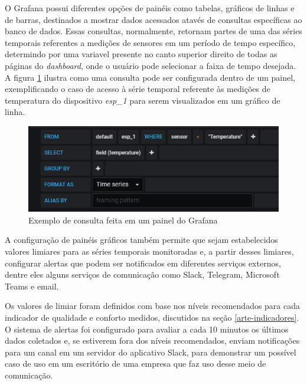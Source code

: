\documentclass[../monografia.tex]{subfiles}
\begin{document}
O Grafana possui diferentes opções de painéis como tabelas, gráficos de linhas e de barras, destinados a mostrar dados acessados atavés de consultas específicas ao banco de dados. Essas consultas, normalmente, retornam partes de uma das séries temporais referentes a medições de sensores em um período de tempo específico, determindo por uma variavel presente no canto superior direito de todas as páginas do \textit{dashboard}, onde o usuário pode selecionar a faixa de tempo desejada. A figura \ref{fig:grafana-query} ilustra como uma consulta pode ser configurada dentro de um painel, exemplificando o caso de acesso à série temporal referente às medições de temperatura do dispositivo \textit{esp\_1} para serem visualizados em um gráfico de linha.

\begin{figure}[h!]
	\centering
	\includegraphics[scale=0.7]{grafana-graph-query.png}
	\caption{Exemplo de consulta feita em um painel do Grafana}
	\label{fig:grafana-query}
\end{figure}


A configuração de painéis gráficos também permite que sejam estabelecidos valores limiares para as séries temporais monitoradas e, a partir desses limiares, configurar alertas que podem ser notificados em diferentes serviços externos, dentre eles alguns serviços de comunicação como Slack, Telegram, Microsoft Teams e email. 

Os valores de limiar foram definidos com base nos níveis recomendados para cada indicador de qualidade e conforto medidos, discutidos na seção \ref{arte-indicadores}. O sistema de alertas foi configurado para avaliar a cada 10 minutos os últimos dados coletados e, se estiverem fora dos níveis recomendados, enviam notificações para um canal em um servidor do aplicativo Slack, para demonstrar um possível caso de uso em um escritório de uma empresa que faz uso desse meio de comunicação.

\end{document}

